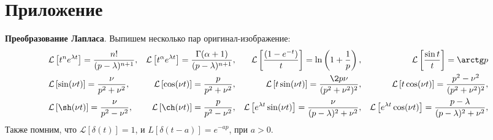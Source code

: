 
\newpage
\section{Приложение}


\textbf{Преобразование Лапласа}. Выпишем несколько пар оригинал-изображение:
\begin{align*}
    &\mathcal L \left[
        t^n e^{\lambda t}
    \right] =  
        \frac{n!}{(p-\lambda)^{n+1}},
    &\mathcal L \left[
        t^\alpha e^{\lambda t}
    \right] =  
        \frac{\Gamma(\alpha+1)}{(p-\lambda)^{n+1}},
    &&\mathcal L \left[
        \frac{\left(1-e^{-t}\right)}{t}
    \right] =  
        \ln \left(1 + \frac{1}{p}\right),
    &&\mathcal L \left[
        \frac{\sin t}{t}
    \right] =  
        \arctg p
    \\
    &\mathcal L \left[
        \sin(\nu t)
    \right] =  
        \frac{\nu}{p^2 + \nu^2},
    &\mathcal L \left[
        \cos(\nu t)
    \right] =  
        \frac{p}{p^2 + \nu^2},
    &&\mathcal L \left[
        t \sin(\nu t)
    \right] =  
        \frac{\2 p \nu}{(p^2 + \nu^2)^2}, 
    &&\mathcal L \left[
        t \cos (\nu t)
    \right] =  
        \frac{p^2 - \nu^2}{(p^2 + \nu^2)^2}, \\
    &\mathcal L \left[
        \sh(\nu t)
    \right] =  
        \frac{\nu}{p^2 - \nu^2},
    &\mathcal L \left[
        \ch(\nu t)
    \right] =  
        \frac{p}{p^2 - \nu^2},
    &&\mathcal L \left[
        e^{\lambda t} \sin(\nu t)
    \right] =  
        \frac{\nu}{(p-\lambda)^2 + \nu^2}, 
    &&\mathcal L \left[
        e^{\lambda t} \cos(\nu t)
    \right] =  
        \frac{p-\lambda}{(p-\lambda)^2 + \nu^2}, 
\end{align*}
Также помним, что $\mathcal L [\delta(t)] = 1$, и $L[\delta(t-a)] = e^{-ap}$, при $a > 0$. 